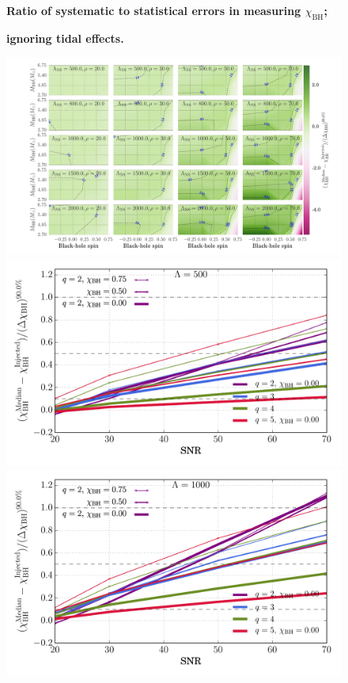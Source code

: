 \documentclass[aps,prd,amsmath,floats,floatfix, twocolumn,
superscriptaddress,nofootinbib,showpacs]{revtex4-1}
\newcommand{\chibh}{\chi_\mathrm{BH}}
\begin{document}
\begin{figure}
\centering
\textbf{Ratio of systematic to statistical errors in measuring $\chibh$;}\par
\textbf{ignoring tidal effects.}\par\medskip
\includegraphics[width=1.95\columnwidth]{plots/TNChiBHBiasesOverCIWidths_CI90_0_Lambda_SNR_linear}
\includegraphics[width=0.8\columnwidth]{plots/TNChiBHBiasesOverCIWidthsVsSNR_Lambda500_CI90_0}
\includegraphics[width=0.8\columnwidth]{plots/TNChiBHBiasesOverCIWidthsVsSNR_Lambda1000_CI90_0}\\

\end{figure}
\end{document}
